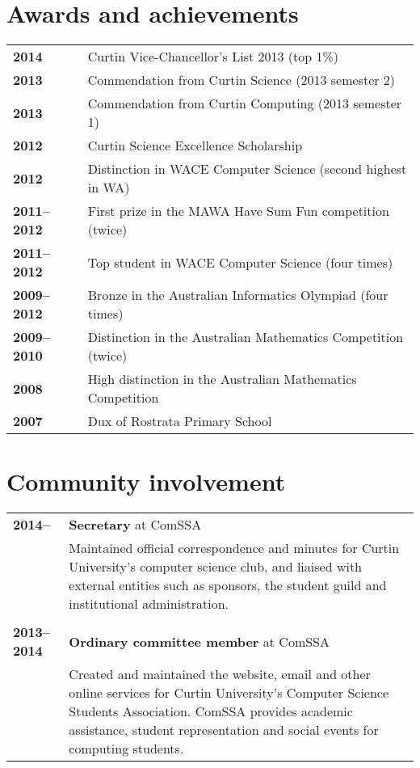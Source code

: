 \documentclass[a4paper,12pt]{article}
\begin{document}
\section*{Awards and achievements}

\begin{tabular}{p{3.5cm}p{12.5cm}}
	\textbf{2014} &
		Curtin Vice-Chancellor's List 2013 (top 1\%)\\
	\textbf{2013} &
		Commendation from Curtin Science (2013 semester 2)\\
	\textbf{2013} &
		Commendation from Curtin Computing (2013 semester 1)\\
	\textbf{2012} &
		Curtin Science Excellence Scholarship\\
	\textbf{2012} &
		Distinction in WACE Computer Science (second highest in WA)\\
	\textbf{2011--2012} &
		First prize in the MAWA Have Sum Fun competition (twice)\\
	\textbf{2011--2012} &
		Top student in WACE Computer Science (four times)\\
	\textbf{2009--2012} &
		Bronze in the Australian Informatics Olympiad (four times)\\
	\textbf{2009--2010} &
		Distinction in the Australian Mathematics Competition (twice)\\
	\textbf{2008} &
		High distinction in the Australian Mathematics Competition\\
	\textbf{2007} &
		Dux of Rostrata Primary School
\end{tabular}

\section*{Community involvement}

\begin{tabular}{p{3.5cm}p{12.5cm}}
	\textbf{2014--} &
		\textbf{Secretary} at ComSSA\\ &
		Maintained official correspondence and minutes for Curtin
		University's computer science club, and liaised with external
		entities such as sponsors, the student guild and institutional
		administration.\\\\
	\textbf{2013--2014} &
		\textbf{Ordinary committee member} at ComSSA\\ &
		Created and maintained the website, email and other online
		services for Curtin University's Computer Science Students
		Association. ComSSA provides academic assistance, student
		representation and social events for computing students.
\end{tabular}
\end{document}
